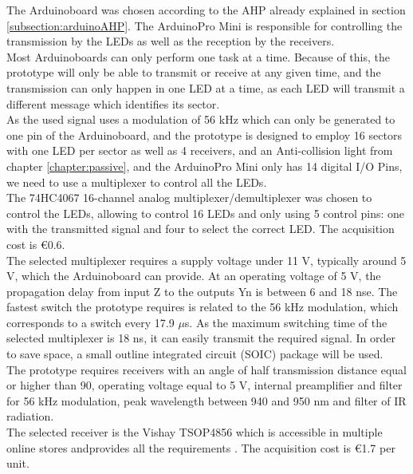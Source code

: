 The Arduino\texttrademark board was chosen according to the AHP already explained in section \ref{subsection:arduinoAHP}. The Arduino\texttrademark Pro Mini is responsible for controlling the transmission by the LEDs as well as the reception by the receivers.\\
Most Arduino\texttrademark boards can only perform one task at a time. Because of this, the prototype will only be able to transmit or receive at any given time, and the transmission can only happen in one LED at a time, as each LED will transmit a different message which identifies its sector.\\
As the used signal uses a modulation of 56 kHz which can only be generated to one pin of the Arduino\texttrademark board, and the prototype is designed to employ 16 sectors with one LED per sector as well as 4 receivers, and an Anti-collision light from chapter \ref{chapter:passive}, and the Arduino\texttrademark Pro Mini only has 14 digital I/O Pins, we need to use a multiplexer to control all the LEDs.\\
The 74HC4067 16-channel analog multiplexer/demultiplexer was chosen to control the LEDs, allowing to control 16 LEDs and only using 5 control pins: one with the transmitted signal and four to select the correct LED. The acquisition cost is \euro{0.6}.\\
The selected multiplexer requires a supply voltage under 11 V, typically around 5 V, which the Arduino\texttrademark board can provide. At an operating voltage of 5 V, the propagation delay from input Z to the outputs Yn is between 6 and 18 nse. The fastest switch the prototype requires is related to the 56 kHz modulation, which corresponds to a switch every 17.9 $\mu$s. As the maximum switching time of the selected multiplexer is 18 ns, it can easily transmit the required signal. In order to save space, a small outline integrated circuit (SOIC) package will be used.\\

The prototype requires receivers with an angle of half transmission distance equal or higher than 90\degree, operating voltage equal to 5 V, internal preamplifier and filter for 56 kHz modulation, peak wavelength between 940 and 950 nm and filter of IR radiation.\\
The selected receiver is the Vishay TSOP4856 which is accessible in multiple online stores andprovides all the requirements \citep{Vishay2015}. The acquisition cost is \euro{1.7} per unit.\\ 

